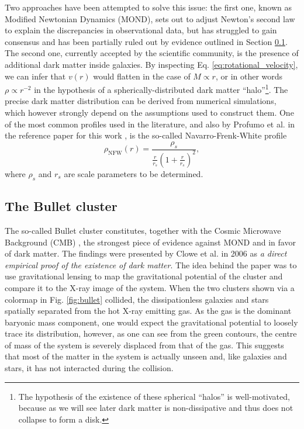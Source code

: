 Two approaches have been attempted to solve this issue: the first one, known as Modified Newtonian Dynamics (MOND), sets out to adjust Newton's second law to explain the discrepancies in observational data, but has struggled to gain consensus and has been partially ruled out by evidence outlined in Section \ref{sec:bullet}. The second one, currently accepted by the scientific community, is the presence of additional dark matter inside galaxies.
By inspecting Eq. \eqref{eq:rotational_velocity}, we can infer that \(v(r)\) would flatten in the case of \(M \propto r\), or in other words \(\rho \propto r^{-2} \) in the hypothesis of a spherically-distributed dark matter ``halo''\footnote{The hypothesis of the existence of these spherical ``halos'' is well-motivated, because as we will see later dark matter is non-dissipative and thus does not collapse to form a disk.}. The precise dark matter distribution can be derived from numerical simulations, which however strongly depend on the assumptions used to construct them. One of the most common profiles used in the literature, and also by Profumo et al. in the reference paper for this work \cite{Profumo_2018}, is the so-called Navarro-Frenk-White profile
\begin{equation}\label{eq:NFW}
	\rho_{\text{NFW}} (r) = \frac{\rho _s}{\frac{r}{r_s}\left( 1+ \frac{r}{r_s} \right)^2 },
\end{equation}
where \(\rho _s\) and \(r_s\) are scale parameters to be determined.

\subsection{The Bullet cluster}\label{sec:bullet}
The so-called Bullet cluster constitutes, together with the Cosmic Microwave Background (CMB) \cite[Section 1.3]{Cirelli_2024}, the strongest piece of evidence against MOND and in favor of dark matter. The findings were presented by Clowe et al. in 2006 \cite{Clowe_2006} as \emph{a direct empirical proof of the existence of dark matter}. The idea behind the paper was to use gravitational lensing to map the gravitational potential of the cluster and compare it to the X-ray image of the system. When the two clusters shown via a colormap in Fig. \ref{fig:bullet} collided, the dissipationless galaxies and stars spatially separated from the hot X-ray emitting gas. As the gas is the dominant baryonic mass component, one would expect the gravitational potential to loosely trace its distribution, however, as one can see from the green contours, the centre of mass of the system is severely displaced from that of the gas. This suggests that most of the matter in the system is actually unseen and, like galaxies and stars, it has not interacted during the collision.

